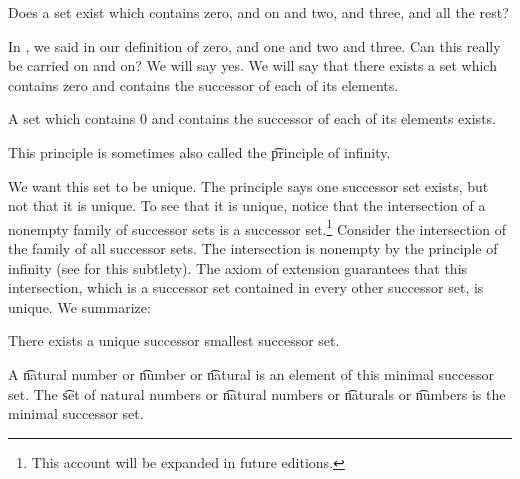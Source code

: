 

Does a set exist which contains zero, and on and two, and three, and all the rest?


In ,
we said  in our definition of zero, and one and two and three.
Can this really be carried on and on?
We will say yes.
We will say that there exists a set which contains zero and contains the successor of each of its elements.

\begin{principle}
  A set which contains 0 and contains the successor of each of its elements exists.
\end{principle}

This principle is sometimes also called the \t{principle of infinity}.

We want this set to be unique.
The principle says one successor set exists, but not that it is unique.
To see that it is unique, notice that the intersection of a nonempty family of successor sets is a successor set.\footnote{This account will be expanded in future editions.}
Consider the intersection of the family of all successor sets.
The intersection is nonempty by the principle of infinity (see  for this subtlety).
The axiom of extension guarantees that this intersection, which is a successor set contained in every other successor set, is unique.
We summarize:

\begin{proposition}
  There exists a unique successor smallest successor set.
  \label{natural_numbers:proposition:omega}
\end{proposition}

A \t{natural number} or \t{number} or \t{natural} is an element of this minimal successor set.
The \t{set of natural numbers} or \t{natural numbers} or \t{naturals} or \t{numbers} is the minimal successor set.


